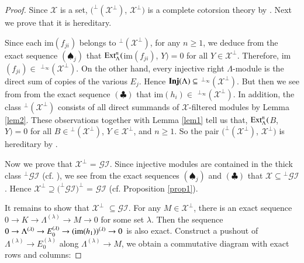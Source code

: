 \documentclass[11pt,a4paper]{article}
\begin{document}
\begin{proof}
Since $\mathscr{X}$ is a set, $(^\perp(\mathscr{X}^\perp)$, $\mathscr{X}^\perp)$ is a   complete
  cotorsion theory by  \cite[Theorem 7.4.1]{eno5}. Next we prove that it is hereditary.

  Since  each im$(f_{ji})$ belongs to $^\perp(\mathscr{X}^\perp)$, for any $n \geq 1$, we deduce from the exact sequence $(\spadesuit_{j})$
that ${\rm Ext}_{\Lambda}^{n}($im$(f_{ji})$, $Y)=0$ for all $Y \in \mathscr{X}^\perp$. Therefore, im$(f_{ji}) \in$  $^{\perp_{\infty}}(\mathscr{X}^\perp)$.
On the other hand, every injective right  $\Lambda$-module is the direct sum
of copies of the various $E_{j}$. Hence   ${\bf Inj}(\Lambda) \subseteq $  $^{\perp_{\infty}}(\mathscr{X}^\perp)$.
But then we see from from the exact sequence $(\clubsuit)$
that  im$(h_{i}) \in$  $^{\perp_{\infty}}(\mathscr{X}^\perp)$.
   In addition, the class  $^\perp(\mathscr{X}^\perp)$ consists of all direct summands of $\mathscr{X}$-filtered modules by Lemma \ref{lem2}.
These observations  together with Lemma \ref{lem1} tell us that, ${\rm Ext}_{\Lambda}^{n}($$B$, $Y)=0$ for all $B \in {^\perp(\mathscr{X}^\perp)}$, $Y \in \mathscr{X}^\perp$,  and $n \geq 1$.
So the pair $(^\perp(\mathscr{X}^\perp)$, $\mathscr{X}^\perp)$   is hereditary by \cite[Lemma 5.24]{gbe}.

Now we prove that  $\mathscr{X}^\perp$ = $\mathscr{GI}$.
Since injective modules are contained in the thick class $^\perp\mathscr{GI}$ (cf. \cite[Lemma 5.24]{ss}), we see from the exact sequences $(\spadesuit_{j})$  and $(\clubsuit)$
that $\mathscr{X} \subseteq {^\perp\mathscr{GI}}$. Hence $\mathscr{X}^\perp \supseteq {(^\perp\mathscr{GI}})^\perp$ = $\mathscr{GI}$ (cf. Proposition \ref{prop1}).

It remains to show that $\mathscr{X}^\perp $   $\subseteq \mathscr{GI}$. For any $M \in \mathscr{X}^\perp $, there is an exact sequence
$0\rightarrow  K    \rightarrow \Lambda^{(\lambda)} \rightarrow  M\rightarrow 0   $  for some set $\lambda$. Then the sequence
$0\rightarrow  \Lambda^{(\lambda)}  \rightarrow E_{0}^{(\lambda)} \rightarrow {\rm(im(}h_{1}))^{(\lambda)}\rightarrow 0   $  is also exact.
 Construct a pushout of  $\Lambda^{(\lambda)}  \rightarrow E_{0}^{(\lambda)}$ along $\Lambda^{(\lambda)} \rightarrow  M$, we obtain a commutative diagram with exact
rows  and columns:



\end{proof}
\end{document}
